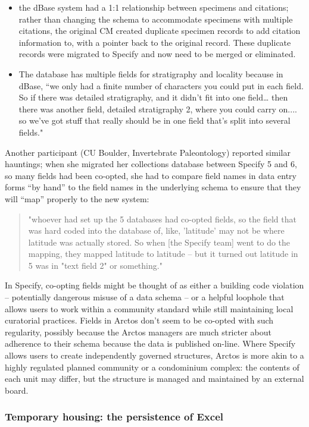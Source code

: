 \begin{itemize}
\item the dBase system had a 1:1 relationship between specimens and citations; rather than changing the schema to accommodate specimens with multiple citations, the original CM created duplicate specimen records to add citation information to, with a pointer back to the original record. These duplicate records were migrated to Specify and now need to be merged or eliminated.
\item The database has multiple fields for stratigraphy and locality because in dBase, “we only had a finite number of characters you could put in each field. So if there was detailed stratigraphy, and it didn't fit into one field… then there was another field, detailed stratigraphy 2, where you could carry on.... so we've got stuff that really should be in one field that's split into several fields."  
\end{itemize}
Another participant (CU Boulder, Invertebrate Paleontology) reported similar hauntings; when she migrated her collections database between Specify 5 and 6, so many fields had been co-opted, she had to compare field names in data entry forms “by hand” to the field names in the underlying schema to ensure that they will “map” properly to the new system: 
\begin{quote}
"whoever had set up the 5 databases had co-opted fields, so the field that was hard coded into the database of, like, 'latitude' may not be where latitude was actually stored. So when [the Specify team] went to do the mapping, they mapped latitude to latitude -- but it turned out latitude in 5 was in "text field 2" or something." 
\end{quote}

In Specify, co-opting fields might be thought of as either a building code violation -- potentially dangerous misuse of a data schema -- or a helpful loophole that allows users to work within a community standard while still maintaining local curatorial practices. Fields in Arctos don't seem to be co-opted with such regularity, possibly because the Arctos managers are much stricter about adherence to their schema because the data is published on-line. Where Specify allows users to create independently governed structures, Arctos is more akin to a highly regulated planned community or a condominium complex: the contents of each unit may differ, but the structure is managed and maintained by an external board.

\subsubsection{Temporary housing: the persistence of Excel}

